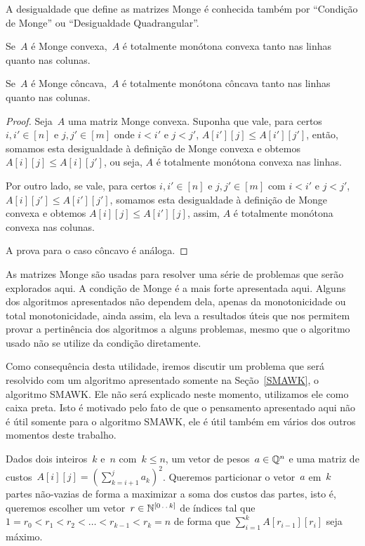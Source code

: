 A desigualdade que define as matrizes Monge é conhecida também por ``Condição de Monge'' ou ``Desigualdade Quadrangular''.

\begin{lema}
Se~$A$ é Monge convexa,~$A$ é totalmente monótona convexa tanto nas linhas quanto nas colunas.  

Se~$A$ é Monge côncava,~$A$ é totalmente monótona côncava tanto nas linhas quanto nas colunas.
\end{lema}

\begin{proof}
Seja~$A$ uma matriz Monge convexa. Suponha que vale, para certos $i,i' \in [n]$ e $j,j' \in [m]$ onde $i < i'$ e $j < j'$, $A[i'][j] \leq A[i'][j']$, então, somamos esta desigualdade à definição de Monge convexa e obtemos $A[i][j] \leq A[i][j']$, ou seja, $A$ é totalmente monótona convexa nas linhas.  

Por outro lado, se vale, para certos $i,i' \in [n]$ e $j,j' \in [m]$ com $i < i'$ e $j < j'$, $A[i][j'] \leq A[i'][j']$, somamos esta desigualdade à definição de Monge convexa e obtemos $A[i][j] \leq A[i'][j]$, assim, $A$ é totalmente monótona convexa nas colunas.  

A prova para o caso côncavo é análoga.
\end{proof}

As matrizes Monge são usadas para resolver uma série de problemas que serão explorados aqui. A condição de Monge é a mais forte apresentada aqui. Alguns dos algoritmos apresentados não dependem dela, apenas da monotonicidade ou total monotonicidade, ainda assim, ela leva a resultados úteis que nos permitem provar a pertinência dos algoritmos a alguns problemas, mesmo que o algoritmo usado não se utilize da condição diretamente.  

Como consequência desta utilidade, iremos discutir um problema que será resolvido com um algoritmo apresentado somente na Seção~\ref{SMAWK}, o algoritmo SMAWK. Ele não será explicado neste momento, utilizamos ele como caixa preta. Isto é motivado pelo fato de que o pensamento apresentado aqui não é útil somente para o algoritmo SMAWK, ele é útil também em vários dos outros momentos deste trabalho.  

\begin{prob} \label{prob:Monge_ex}
Dados dois inteiros~$k$ e~$n$ com~$k \leq n$, um vetor de pesos~$a \in \mathbb{Q}^n$ e uma matriz de custos~${A[i][j] = \left(\sum\limits_{k=i+1}^{j} a_k\right)^2}$. Queremos particionar o vetor~$a$ em~$k$ partes não-vazias de forma a maximizar a soma dos custos das partes, isto é, queremos escolher um vetor~${r \in \mathbb{N}^{[0 \,.\,.\, k]}}$ de índices tal que~${1 = r_0 < r_1 < r_2 < \dots < r_{k-1} < r_k = n}$ de forma que $\sum\limits_{i=1}^{k} A[r_{i-1}][r_i]$ seja máximo.
\end{prob}

